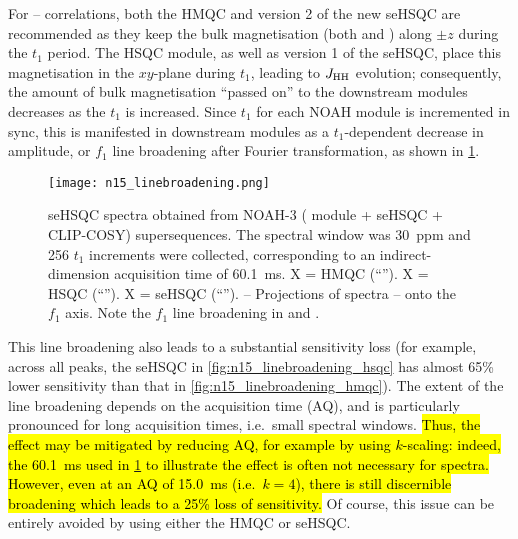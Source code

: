 For \nitrogen{}--\proton{} correlations, both the HMQC and version 2 of the new seHSQC are recommended as they keep the bulk magnetisation (both  and ) along $\pm z$ during the $t_1$ period.
The HSQC module, as well as version 1 of the seHSQC, place this magnetisation in the $xy$-plane during $t_1$, leading to $\jhh$ evolution; consequently, the amount of bulk magnetisation ``passed on'' to the downstream modules decreases as the \nitrogen{} $t_1$ is increased.
Since $t_1$ for each NOAH module is incremented in sync, this is manifested in downstream modules as a $t_1$-dependent decrease in amplitude, or $f_1$ line broadening after Fourier transformation, as shown in \cref{fig:n15_linebroadening}.

\begin{figure}
    \centering
    \texttt{[image: n15\_linebroadening.png]}
    {\label{fig:n15_linebroadening_hmqc}}
    {\label{fig:n15_linebroadening_hsqc}}
    {\label{fig:n15_linebroadening_spv2}}
    {\label{fig:n15_linebroadening_hmqc_f2proj}}
    {\label{fig:n15_linebroadening_hsqc_f2proj}}
    {\label{fig:n15_linebroadening_spv2_f2proj}}
    \caption{
        \carbon{} seHSQC spectra obtained from NOAH-3  (\nitrogen{} module + \carbon{} seHSQC + CLIP-COSY) supersequences.
        The \nitrogen{} spectral window was \SI{30}{ppm} and 256 $t_1$ increments were collected, corresponding to an indirect-dimension \nitrogen{} acquisition time of \SI{60.1}{\ms}.
        \textbf{} X = HMQC (``\noahM{}'').
        \textbf{} X = HSQC (``\noahS{}'').
        \textbf{} X = seHSQC (``\noahSpn{}'').
        \textbf{}--\textbf{} Projections of spectra \textbf{}--\textbf{} onto the $f_1$ axis.
        Note the $f_1$ line broadening in  and .
        \grami{}
    }
    \label{fig:n15_linebroadening}
\end{figure}

This line broadening also leads to a substantial sensitivity loss (for example, across all peaks, the \carbon{} seHSQC in \cref{fig:n15_linebroadening_hsqc} has almost 65\% lower sensitivity than that in \cref{fig:n15_linebroadening_hmqc}).
The extent of the line broadening depends on the acquisition time (AQ), and is particularly pronounced for long acquisition times, i.e.\ small \nitrogen{} spectral windows.
\hl{Thus, the effect may be mitigated by reducing AQ, for example by using $k$-scaling: indeed, the \SI{60.1}{\ms} used in \cref{fig:n15_linebroadening} to illustrate the effect is often not necessary for \nitrogen{} spectra.
However, even at an AQ of \SI{15.0}{\ms} (i.e.\ $k = 4$), there is still discernible broadening which leads to a 25\% loss of sensitivity.}
Of course, this issue can be entirely avoided by using either the HMQC or seHSQC.

